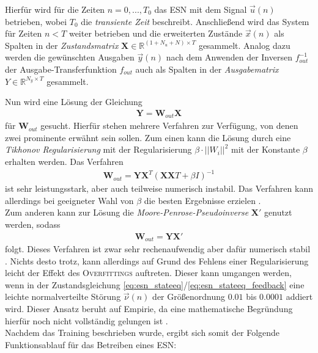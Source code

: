 Hierfür wird für die Zeiten $n=0, ..., T_0$ das \textsc{ESN} mit dem Signal $\vec{u}(n)$ betrieben, wobei $T_0$ die \textit{transiente Zeit} beschreibt. Anschließend wird das System für Zeiten $n < T$ weiter betrieben und die erweiterten Zustände $\vec{x}(n)$ als Spalten in der \textit{Zustandsmatrix} $\mathbf{X} \in \mathbb{R}^{(1 + N_u + N) \times T}$ gesammelt. Analog dazu werden die gewünschten Ausgaben $\vec{y}(n)$ nach dem Anwenden der Inversen $f^{-1}_{out}$ der Ausgabe-Transferfunktion $f_{out}$ auch als Spalten in der \textit{Ausgabematrix} $Y \in \mathbb{R}^{N_y \times T}$ gesammelt.

Nun wird eine Lösung der Gleichung
\begin{align}
\mathbf{Y} = \mathbf{W}_{out} \mathbf{X}
\end{align}
für $\mathbf{W}_{out}$ gesucht. Hierfür stehen mehrere Verfahren zur Verfügung, von denen zwei prominente erwähnt sein sollen.
Zum einen kann die Lösung durch eine \textit{Tikhonov Regularisierung} mit der Regularisierung $\beta \cdot ||{W_i}||^2$ mit der Konstante $\beta$ erhalten werden. Das Verfahren
\begin{align}
\mathbf{W}_{out} = \mathbf{Y} \mathbf{X}^T \left(\mathbf{X} \mathbf{X}T + \beta I \right)^{-1}
\end{align}
ist sehr leistungsstark, aber auch teilweise numerisch instabil. Das Verfahren kann allerdings bei geeigneter Wahl von $\beta$ die besten Ergebnisse erzielen \cite{lukoseviciusa2009}.\\

Zum anderen kann zur Lösung die \textit{Moore-Penrose-Pseudoinverse} $\mathbf{X}'$ genutzt werden, sodass
\begin{align}
\mathbf{W}_{out} = \mathbf{Y} \mathbf{X}'
\end{align}
folgt. Dieses Verfahren ist zwar sehr rechenaufwendig aber dafür numerisch stabil \cite{lukoseviciusa2009, jaeger2012}. Nichts desto trotz, kann allerdings auf Grund des Fehlens einer Regularisierung leicht der Effekt des \textsc{Overfittings} auftreten. Dieser kann umgangen werden, wenn in der Zustandsgleichung \ref{eq:esn_stateeq}/\ref{eq:esn_stateeq_feedback} eine leichte normalverteilte Störung $\vec{\nu}(n)$ der Größenordnung $0.01$ bis $0.0001$ addiert wird. Dieser Ansatz beruht auf Empirie, da eine mathematische Begründung hierfür noch nicht vollständig gelungen ist \citep{jaeger2010, lukoseviciusa2009}.\\

\newpage
Nachdem das Training beschrieben wurde, ergibt sich somit der Folgende Funktionsablauf für das Betreiben eines \textsc{ESN}:

